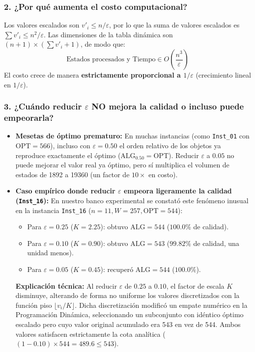 \subsubsection*{2. ¿Por qué aumenta el costo computacional?}
Los valores escalados son $v'_i \le n/\varepsilon$, por lo que la suma de valores escalados es $\sum v'_i \le n^2/\varepsilon$. Las dimensiones de la tabla dinámica son $(n + 1) \times (\sum v'_i + 1)$, de modo que:
\begin{equation}
    \text{Estados procesados y Tiempo} \in O\left( \frac{n^3}{\varepsilon} \right)
\end{equation}
El costo crece de manera \textbf{estrictamente proporcional a $1/\varepsilon$} (crecimiento lineal en $1/\varepsilon$).

\subsubsection*{3. ¿Cuándo reducir $\varepsilon$ NO mejora la calidad o incluso puede empeorarla?}
\begin{itemize}
    \item \textbf{Mesetas de óptimo prematuro:} En muchas instancias (como \texttt{Inst\_01} con $\text{OPT}=566$), incluso con $\varepsilon = 0.50$ el orden relativo de los objetos ya reproduce exactamente el óptimo ($\text{ALG}_{0.50} = \text{OPT}$). Reducir $\varepsilon$ a $0.05$ no puede mejorar el valor real ya óptimo, pero sí multiplica el volumen de estados de 1892 a 19360 (un factor de $10\times$ en costo).
    \item \textbf{Caso empírico donde reducir $\varepsilon$ empeora ligeramente la calidad (\texttt{Inst\_16}):}
    En nuestro banco experimental se constató este fenómeno inusual en la instancia \texttt{Inst\_16} ($n=11, W=257, \text{OPT}=544$):
    \begin{itemize}
        \item Para $\varepsilon = 0.25$ ($K = 2.25$): obtuvo $\text{ALG} = 544$ ($100.0\%$ de calidad).
        \item Para $\varepsilon = 0.10$ ($K = 0.90$): obtuvo $\text{ALG} = 543$ ($99.82\%$ de calidad, una unidad menos).
        \item Para $\varepsilon = 0.05$ ($K = 0.45$): recuperó $\text{ALG} = 544$ ($100.0\%$).
    \end{itemize}
    \textbf{Explicación técnica:} Al reducir $\varepsilon$ de $0.25$ a $0.10$, el factor de escala $K$ disminuye, alterando de forma no uniforme los valores discretizados con la función piso $\lfloor v_i / K \rfloor$. Dicha discretización modificó un empate numérico en la Programación Dinámica, seleccionando un subconjunto con idéntico óptimo escalado pero cuyo valor original acumulado era 543 en vez de 544. Ambos valores satisfacen estrictamente la cota analítica ($(1 - 0.10) \times 544 = 489.6 \le 543$).
\end{itemize}

